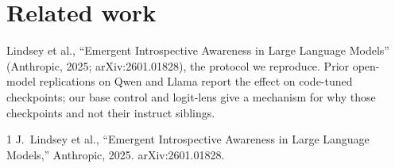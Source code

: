 \documentclass[11pt]{article}
\begin{document}
\section*{Related work}

Lindsey et al., ``Emergent Introspective Awareness in Large Language Models'' (Anthropic, 2025; arXiv:2601.01828), the protocol we reproduce. Prior open-model replications on Qwen and Llama report the effect on code-tuned checkpoints; our base control and logit-lens give a mechanism for why those checkpoints and not their instruct siblings.

\begin{thebibliography}{1}
J.~Lindsey et al.,
``Emergent Introspective Awareness in Large Language Models,''
Anthropic, 2025. arXiv:2601.01828.
\end{thebibliography}
\end{document}
